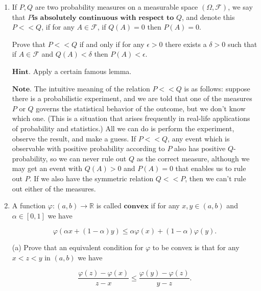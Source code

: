 \documentclass[11pt]{report}
\providecommand{\cal}{\mathcal}
\newcommand{\R}{\mathbb{R}}
\theoremstyle{plain}
\theoremstyle{definition}
\begin{document}
\begin{enumerate}[label=\arabic*.]
\[
1_{\liminf A_n} = \liminf_n 1_{A_n}.
\]

\noindent (b) Let $U$ be a uniform random variable in $(0,1)$.
For each $n\ge 1$ define an event $A_n$ by

\[
A_n = \{U < 1/n\}.
\]

\noindent Note that
$\sum_{n=1}^\infty \mathrm{P}(A_n) = \infty$.
However, compute $\mathrm{P}(A_n\textrm{ i.o.})$ and
show that the conclusion of the second Borel-Cantelli
lemma does not hold (of course, one of the assumptions
of the lemma also doesn't hold, so there's no
contradiction).

\item If $P,Q$ are two probability measures on a measurable
space $(\Omega, {\cal F})$, we say that $\textbf{$P
$is absolutely continuous with respect to } Q$, and
denote this $P<<Q$, if for any $A\in {\cal F}$, if
$Q(A)=0$ then $P(A)=0$.

Prove that $P<<Q$ if and only if for any $\epsilon>0$
there exists a $\delta>0$ such that if $A\in {\cal F}$
and $Q(A)<\delta$ then $P(A)<\epsilon$.

$\textbf{Hint.}$ Apply a certain famous lemma.

$\textbf{Note.}$ The intuitive meaning of the
relation $P<<Q$ is as follows: suppose there is a
probabilistic experiment, and we are told that one of
the measures $P$ or $Q$ governs the statistical
behavior of the outcome, but we don't know which one.
(This is a situation that arises frequently in
real-life applications of probability and statistics.)
All we can do is perform the experiment, observe the
result, and make a guess. If $P<<Q$, any event which
is observable with positive probability according to
$P$ also has positive $Q$-probability, so we can
never rule out $Q$ as the correct measure, although
we may get an event with $Q(A)>0$ and $P(A)=0$ that
enables us to rule out $P$. If we also have the
symmetric relation $Q<<P$, then we can't rule out
either of the measures.

\item A function $\varphi:(a,b)\to\R$ is called
$\textbf{convex}$ if for any $x,y\in (a,b)$ and
$\alpha\in [0,1]$ we have

\[
\varphi(\alpha x + (1-\alpha)y) \le \alpha \varphi(x) + (1-\alpha) \varphi(y).
\]

\noindent (a) Prove that an equivalent condition for $\varphi$
to be convex is that for any $x<z<y$ in $(a,b)$ we
have

\[
\frac{\varphi(z)-\varphi(x)}{z-x} \le \frac{\varphi(y)-\varphi(z)}{y-z}.
\]


\end{enumerate}
\end{document}
